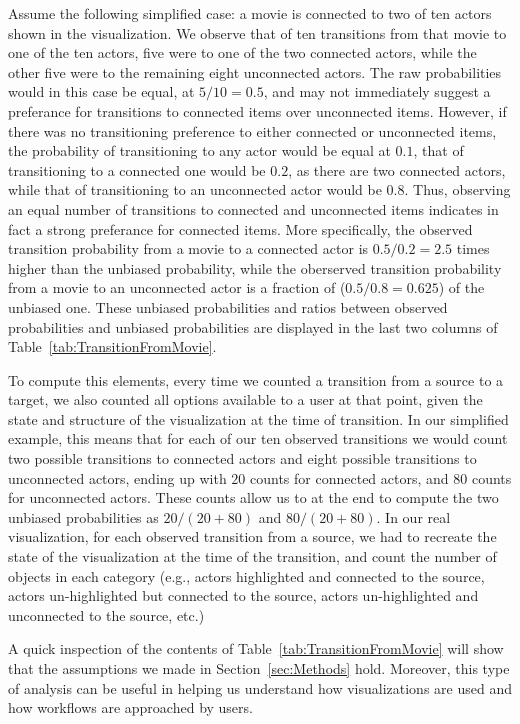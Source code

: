 Assume the following simplified case: a movie is connected to two of ten actors shown in the visualization. We observe that of ten transitions from that movie to one of the ten actors, five were to one of the two connected actors, while the other five were to the remaining eight unconnected actors. The raw probabilities would in this case be equal, at $5/10 = 0.5$, and may not immediately suggest a preferance for transitions to connected items over unconnected items. However, if there was no transitioning preference to either connected or unconnected items, the probability of transitioning to any actor would be equal at $0.1$, that of  transitioning to a connected one would be $0.2$, as there are two connected actors, while that of transitioning to an unconnected actor would be $0.8$. Thus, observing an equal number of transitions to connected and unconnected items indicates in fact a strong preferance for connected items. More specifically, the observed transition probability from a movie to a connected actor is $0.5/0.2=2.5$ times higher than the unbiased probability, while the oberserved transition probability from a movie to an unconnected actor is a fraction of ($0.5/0.8=0.625$) of the unbiased one.  These unbiased probabilities and ratios between observed probabilities and unbiased probabilities are displayed in the last two columns of Table~\ref{tab:TransitionFromMovie}. 

To compute this elements, every time we counted a transition from a source to a target, we also counted all options available to a user at that point, given the state and structure of the visualization at the time of transition. In our simplified example, this means that for each of our ten observed transitions we would count two possible transitions to connected actors and eight possible transitions to unconnected actors, ending up with $20$ counts for connected actors, and $80$ counts for unconnected actors. These counts allow us to at the end to compute the two unbiased probabilities as $20/(20+80)$ and $80/(20+80)$. In our real visualization, for each observed transition from a source, we had to recreate the state of the visualization at the time of the transition, and count the number of objects in each category (e.g., actors highlighted and connected to the source, actors un-highlighted but connected to the source, actors un-highlighted and unconnected to the source, etc.)  

A quick inspection of the contents of Table~\ref{tab:TransitionFromMovie} will show that the assumptions we made in Section~\ref{sec:Methods} hold. Moreover, this type of analysis can be useful in helping us understand how visualizations are used and how workflows are approached by users.


